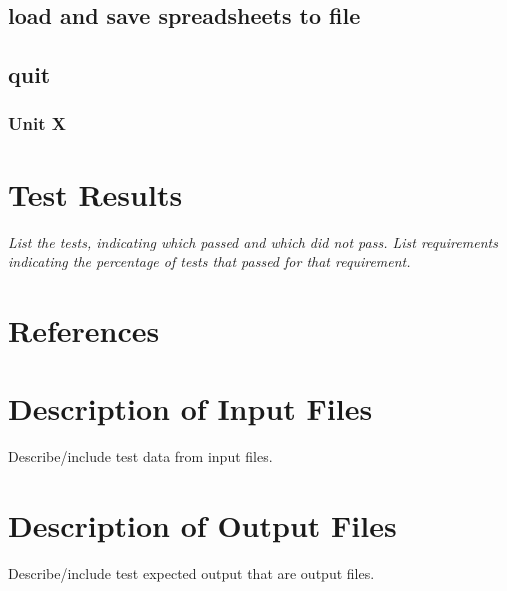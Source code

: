 \documentclass[12pt]{article}
\begin{document}
\subsection{load and save spreadsheets to file} 
\subsection{quit}

\subsubsection{Unit X}

\section{Test Results}

{\it
List the tests, indicating which passed and which did not pass.
List requirements indicating the percentage of tests that passed for that requirement.
}

\section{References}

\appendix

\section{Description of Input Files}

Describe/include test data from input files.

\section{Description of Output Files}

Describe/include test expected output that are output files.
\end{document}
